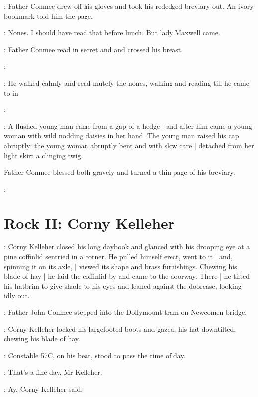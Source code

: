 :
Father Conmee drew off his gloves
and took his rededged breviary out.
An ivory bookmark told him the page.

\conmeeint:
Nones.
I should have read that before lunch.
But lady Maxwell came.

:
Father Conmee read in secret  and 
and crossed his breast.

\conmeeint:

:
He walked calmly and read mutely the nones,
walking and reading till
he came to
 in

\conmeeint:

:
A flushed young man came from a gap of a hedge |
and after him came a young woman
with wild nodding daisies in her hand.
The young man raised his cap abruptly:
the young woman abruptly bent
and with slow care |
detached from her light skirt a clinging twig.

Father Conmee blessed both gravely
and turned a thin page of his breviary.

\conmeeint:


\section*{Rock II: Corny Kelleher}

:
Corny Kelleher closed his long daybook
and glanced with his drooping eye
at a pine coffinlid sentried in a corner.
He pulled himself erect,
went to it |
and, spinning it on its axle, |
viewed its shape and brass furnishings.
Chewing his blade of hay |
he laid the coffinlid by and came to the doorway.
There |
he tilted his hatbrim to give shade to his eyes
and leaned against the doorcase,
looking idly out.

:
Father John Conmee stepped into the Dollymount tram on Newcomen bridge.

:
Corny Kelleher locked his largefooted boots and gazed,
his hat downtilted,
chewing his blade of hay.

:
Constable 57C,
on his beat,
stood to pass the time of day.

\constable:
That's a fine day, Mr Kelleher.

\corny:
Ay, \sout{Corny Kelleher said}.

